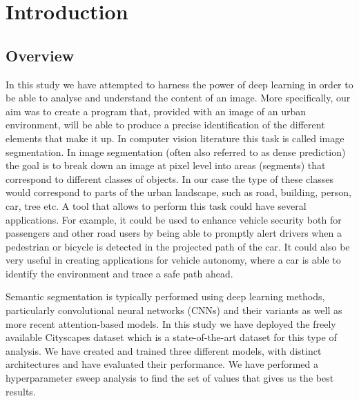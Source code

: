 \section{Introduction}
\subsection{Overview}

In this study we have attempted to harness the power of deep learning in order to be able to analyse and understand the content of an image. More specifically, our aim was to create a program that, provided with an image of an urban environment, will be able to produce a precise identification of the different elements that make it up. In computer vision literature this task is called image segmentation. In image segmentation (often also referred to as dense prediction) the goal is to break down an image at pixel level into areas (segments) that correspond to different classes of objects. In our case the type of these classes would correspond to parts of the urban landscape, such as road, building, person, car, tree etc. A tool that allows to perform this task could have several applications. For example, it could be used to enhance vehicle security both for passengers and other road users by being able to promptly alert drivers when a pedestrian or bicycle is detected in the projected path of the car. It could also be very useful in creating applications for vehicle autonomy, where a car is able to identify the environment and trace a safe path ahead. 

Semantic segmentation is typically performed using deep learning methods, particularly convolutional neural networks (CNNs) and their variants as well as more recent attention-based models. In this study we have deployed the freely available Cityscapes dataset \cite{DBLP:journals/corr/CordtsORREBFRS16} which is a state-of-the-art dataset for this type of analysis. We have created and trained three different models, with distinct architectures and have evaluated their performance. We have performed a hyperparameter sweep analysis to find the set of values that gives us the best results. 

